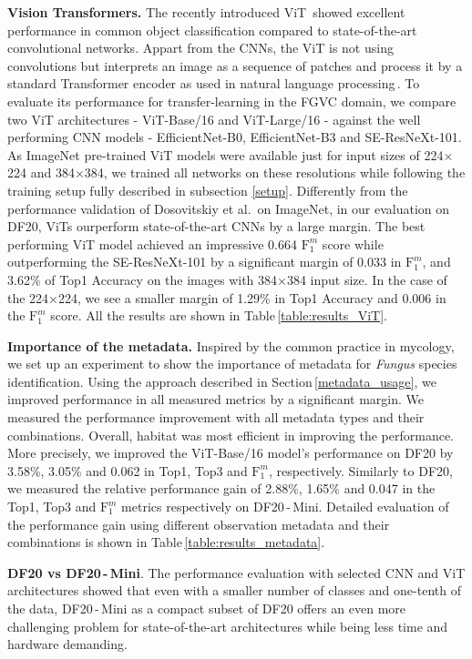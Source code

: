 \documentclass[10pt,twocolumn,letterpaper]{article}
\begin{document}
\textbf{Vision Transformers.}
The recently introduced ViT\,\cite{vit} showed excellent performance in common object classification compared to state-of-the-art convolutional networks. Appart from the CNNs, the ViT is not using convolutions but interprets an image as a sequence of patches and process it by a standard Transformer encoder as used in  natural language processing\,\cite{vaswani2017attention}.
To evaluate its performance for transfer-learning in the FGVC domain, we compare two ViT architectures - ViT-Base/16 and ViT-Large/16 - against the well performing CNN models - EfficientNet-B0, EfficientNet-B3 and SE-ResNeXt-101. As ImageNet pre-trained ViT models were available just for input sizes of 224$\times$224 and 384$\times$384, we trained all networks on these resolutions while following the training setup fully described in subsection \ref{setup}. Differently from the performance validation of Dosovitskiy et al.\,\cite{vit} on ImageNet, in our evaluation on DF20, ViTs ourperform state-of-the-art CNNs by a large margin. The best performing ViT model achieved an impressive 0.664 $\text{F}_{1}^{m}$ score while outperforming the SE-ResNeXt-101 by a significant margin of 0.033 in $\text{F}_{1}^{m}$, and 3.62\% of Top1 Accuracy on the images with 384$\times$384 input size. In the case of the  224$\times$224, we see a smaller margin of 1.29\% in Top1 Accuracy and 0.006 in the  $\text{F}_{1}^{m}$ score. All the results are shown in Table\,\ref{table:results_ViT}.


\textbf{Importance of the metadata.} Inspired by the common practice in mycology, we set up an experiment to show the importance of metadata for \textit{Fungus} species identification. Using the approach described in Section\,\ref{metadata_usage}, we improved performance in all measured metrics by a significant margin. We measured the performance improvement with all metadata types and their combinations. Overall, habitat was most efficient in improving the performance. More precisely, we improved the ViT-Base/16 model's performance on DF20 by 3.58\%, 3.05\% and 0.062 in Top1, Top3 and $\text{F}_{1}^{m}$, respectively. Similarly to DF20, we measured the relative performance gain of 2.88\%, 1.65\% and 0.047 in the Top1, Top3 and $\text{F}_{1}^{m}$ metrics respectively on DF20\,-\,Mini. Detailed evaluation of the performance gain using different observation metadata and their combinations is shown in Table\,\ref{table:results_metadata}.

\textbf{DF20 vs DF20\,-\,Mini}. The performance evaluation with selected CNN and ViT architectures showed that even with a smaller number of classes and one-tenth of the data, DF20\,-\,Mini as a compact subset of DF20 offers an even more challenging problem for state-of-the-art architectures while being less time and hardware demanding.
\end{document}
